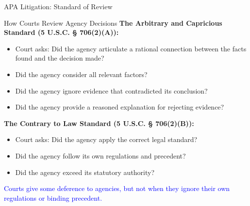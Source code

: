 \documentclass[11pt]{beamer}
\begin{document}
	\begin{frame}{APA Litigation: Standard of Review}
		\scriptsize
		\begin{block}{How Courts Review Agency Decisions}
			\textbf{The Arbitrary and Capricious Standard (5 U.S.C. § 706(2)(A)):}
			\begin{itemize}
				\item Court asks: Did the agency articulate a rational connection between the facts found and the decision made?
				\item Did the agency consider all relevant factors?
				\item Did the agency ignore evidence that contradicted its conclusion?
				\item Did the agency provide a reasoned explanation for rejecting evidence?
			\end{itemize}
			\textbf{The Contrary to Law Standard (5 U.S.C. § 706(2)(B)):}
			\begin{itemize}
				\item Court asks: Did the agency apply the correct legal standard?
				\item Did the agency follow its own regulations and precedent?
				\item Did the agency exceed its statutory authority?
			\end{itemize}
			\textcolor{blue}{Courts give some deference to agencies, but not when they ignore their own regulations or binding precedent.}
		\end{block}
	\end{frame}
	
\end{document}
